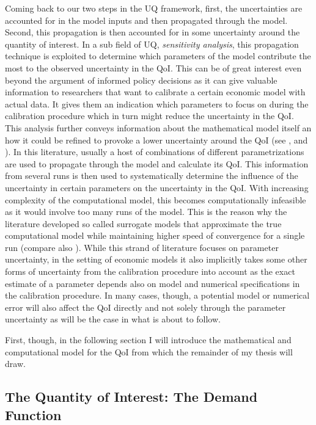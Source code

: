 Coming back to our two steps in the UQ framework, first, the uncertainties are accounted for in the model inputs and then propagated through the model. Second, this propagation is then accounted for in some uncertainty around the quantity of interest. In a sub field of UQ, \textit{sensitivity analysis}, this propagation technique is exploited to determine which parameters of the model contribute the most to the observed uncertainty in the QoI. This can be of great interest even beyond the argument of informed policy decisions as it can give valuable information to researchers that want to calibrate a certain economic model with actual data. It gives them an indication which parameters to focus on during the calibration procedure which in turn might reduce the uncertainty in the QoI. This analysis further conveys information about the mathematical model itself an how it could be refined to provoke a lower uncertainty around the QoI (see \cite{Scheidegger.2019},  \cite{Harenberg.2019} and \cite{Ghanem.2017}). In this literature, usually a host of combinations of different parametrizations are used to propagate through the model and calculate its QoI. This information from several runs is then used to systematically determine the influence of the uncertainty in certain parameters on the uncertainty in the QoI. With increasing complexity of the computational model, this becomes computationally infeasible as it would involve too many runs of the model. This is the reason why the literature developed so called surrogate models that approximate the true computational model while maintaining higher speed of convergence for a single run (compare also \cite{Saltelli.2008}). While this strand of literature focuses on parameter uncertainty, in the setting of economic models it also implicitly takes some other forms of uncertainty from the calibration procedure into account as the exact estimate of a parameter depends also on model and numerical specifications in the calibration procedure. In many cases, though, a potential model or numerical error will also affect the QoI directly and not solely through the parameter uncertainty as will be the case in what is about to follow.

First, though, in the following section I will introduce the mathematical and computational model for the QoI from which the remainder of my thesis will draw.

\subsection{The Quantity of Interest: The Demand Function}

